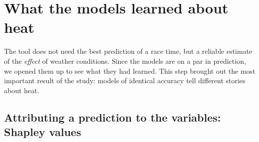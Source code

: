 \documentclass[11pt,a4paper]{article}
\begin{document}
\section{What the models learned about heat}\label{sec:interpretation}

The tool does not need the best prediction of a race time, but a reliable estimate of the \emph{effect} of weather
conditions. Since the models are on a par in prediction, we opened them up to see what they had learned. This step
brought out the most important result of the study: models of identical accuracy tell different stories about heat.

\subsection{Attributing a prediction to the variables: Shapley values}\label{sec:shap}
\end{document}
